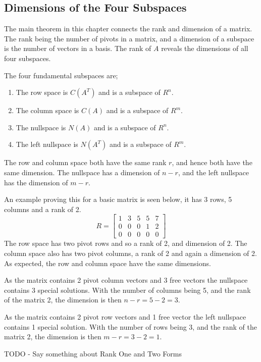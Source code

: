     \subsection{Dimensions of the Four Subspaces}
        The main theorem in this chapter connects the rank and dimension of a matrix. The rank being the number of 
        pivots in a matrix, and a dimension of a subspace is the number of vectors in a basis. The rank of \(A\) 
        reveals the dimensions of all four subspaces.
        
        \par \hfill \break
        The four fundamental subspaces are;
        \begin{enumerate}
            \item The row space is \(C(A^T)\) and is a subspace of \(R^n\).
            \item The column space is \(C(A)\) and is a subspace of \(R^m\).
            \item The nullspace is \(N(A)\) and is a subspace of \(R^n\).
            \item The left nullspace is \(N(A^T)\) and is a subspace of \(R^m\).
        \end{enumerate}
        
        \par \hfill \break
        The row and column space both have the same rank \(r\), and hence both have the same dimension. The nullspace 
        has a dimension of \(n-r\), and the left nullspace has the dimension of \(m-r\).
        
        \par \hfill \break
        An example proving this for a basic matrix is seen below, it has 3 rows, 5 columns and a rank of 2.
        \begin{equation}
            R = 
            \begin{bmatrix}
                1 & 3 & 5 & 5 & 7 \\
                0 & 0 & 0 & 1 & 2 \\
                0 & 0 & 0 & 0 & 0
            \end{bmatrix}
        \end{equation}
        The row space has two pivot rows and so a rank of 2, and dimension of 2. The column space also has two pivot 
        columns, a rank of 2 and again a dimension of 2. As expected, the row and column space have the same 
        dimensions.
        
        \par \hfill \break
        As the matrix contains 2 pivot column vectors and 3 free vectors the nullspace contains 3 special solutions. 
        With the number of columns being 5, and the rank of the matrix 2, the dimension is then \(n-r=5-2=3\).
        
        \par \hfill \break
        As the matrix contains 2 pivot row vectors and 1 free vector the left nullspace contains 1 special solution. 
        With the number of rows being 3, and the rank of the matrix 2, the dimension is then \(m-r=3-2=1\).
        
        \par \hfill \break
        TODO - Say something about Rank One and Two Forms
    